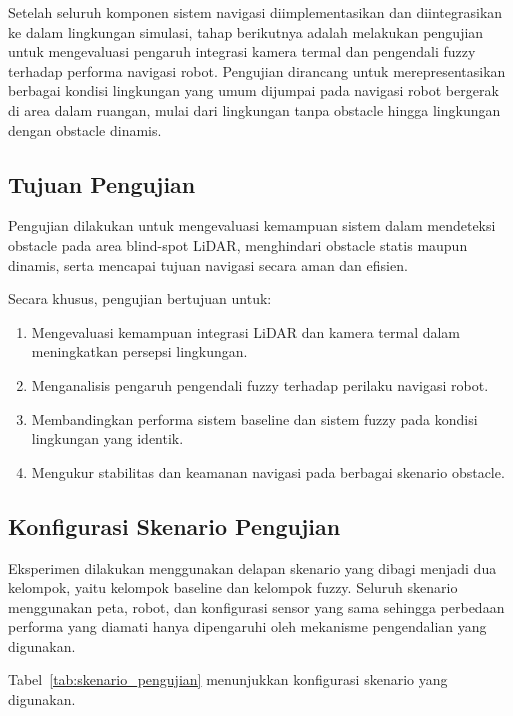 Setelah seluruh komponen sistem navigasi diimplementasikan dan diintegrasikan ke dalam lingkungan simulasi, tahap berikutnya adalah melakukan pengujian untuk mengevaluasi pengaruh integrasi kamera termal dan pengendali fuzzy terhadap performa navigasi robot. Pengujian dirancang untuk merepresentasikan berbagai kondisi lingkungan yang umum dijumpai pada navigasi robot bergerak di area dalam ruangan, mulai dari lingkungan tanpa obstacle hingga lingkungan dengan obstacle dinamis.

\subsection{Tujuan Pengujian}

Pengujian dilakukan untuk mengevaluasi kemampuan sistem dalam mendeteksi obstacle pada area blind-spot LiDAR, menghindari obstacle statis maupun dinamis, serta mencapai tujuan navigasi secara aman dan efisien.

Secara khusus, pengujian bertujuan untuk:

\begin{enumerate}
\item Mengevaluasi kemampuan integrasi LiDAR dan kamera termal dalam meningkatkan per\-sepsi lingkungan.
\item Menganalisis pengaruh pengendali fuzzy terhadap perilaku navigasi robot.
\item Membandingkan performa sistem baseline dan sistem fuzzy pada kondisi lingkungan yang identik.
\item Mengukur stabilitas dan keamanan navigasi pada berbagai skenario obstacle.
\end{enumerate}

\subsection{Konfigurasi Skenario Pengujian}

Eksperimen dilakukan menggunakan delapan skenario yang dibagi menjadi dua kelompok, yaitu kelompok baseline dan kelompok fuzzy. Seluruh skenario menggunakan peta, robot, dan konfigurasi sensor yang sama sehingga perbedaan performa yang diamati hanya dipengaruhi oleh mekanisme pengendalian yang digunakan.

Tabel~\ref{tab:skenario_pengujian} menunjukkan konfigurasi skenario yang digunakan.

